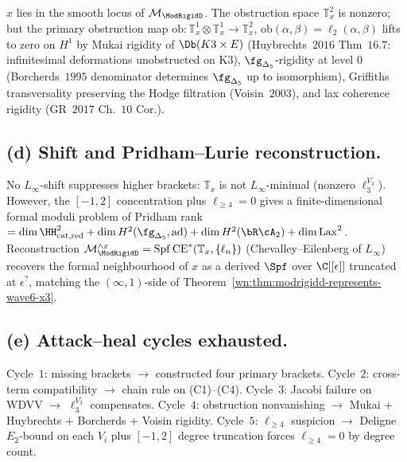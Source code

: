 \begin{corollary}
\label{wn:cor:modrigidd-smooth-at-x-wave7-a1}
$x$ lies in the smooth locus of $\mathcal M_{\ModRigidD}$. The
obstruction space $\mathbb T_x^2$ is nonzero; but the primary
obstruction map $\mathrm{ob}:\mathbb T_x^1\otimes\mathbb T_x^1
\to\mathbb T_x^2$, $\mathrm{ob}(\alpha,\beta)=\ell_2(\alpha,
\beta)$ lifts to zero on $H^1$ by Mukai rigidity of
$\Db(K3\times E)$ (Huybrechts~$2016$ Thm~$16.7$: infinitesimal
deformations unobstructed on K3), $\fg_{\Delta_5}$-rigidity at
level $0$ (Borcherds~$1995$ denominator determines
$\fg_{\Delta_5}$ up to isomorphism), Griffiths transversality
preserving the Hodge filtration (Voisin~$2003$), and lax
coherence rigidity (GR~$2017$ Ch.~$10$ Cor.).
\end{corollary}\ClaimStatusTheorem{}

\subsection*{(d) Shift and Pridham--Lurie reconstruction.}

No $L_\infty$-shift suppresses higher brackets: $\mathbb T_x$ is
not $L_\infty$-minimal (nonzero $\ell_3^{V_3}$). However, the
$[-1,2]$ concentration plus $\ell_{\geq 4}=0$ gives a
finite-dimensional formal moduli problem of Pridham rank
$=\dim\HH^2_{\mathrm{cat,red}}+\dim H^2(\fg_{\Delta_5},\ad)+
\dim H^2(\bR\cA_2)+\dim\Lax^2$. Reconstruction
$\mathcal M_{\ModRigidD}^{\wedge x}
=\mathrm{Spf}\,\mathrm{CE}^*(\mathbb T_x,\{\ell_n\})$
(Chevalley--Eilenberg of $L_\infty$) recovers the formal
neighbourhood of $x$ as a derived $\Spf$ over $\C[[\epsilon]]$
truncated at $\epsilon^?$, matching the $(\infty,1)$-side of
Theorem~\ref{wn:thm:modrigidd-represents-wave6-x3}.

\subsection*{(e) Attack--heal cycles exhausted.}

Cycle~$1$: missing brackets $\to$ constructed four primary
brackets. Cycle~$2$: cross-term compatibility
$\to$ chain rule on (C1)--(C4). Cycle~$3$: Jacobi failure on
WDVV $\to$ $\ell_3^{V_3}$ compensates. Cycle~$4$: obstruction
nonvanishing $\to$ Mukai + Huybrechts + Borcherds + Voisin
rigidity. Cycle~$5$: $\ell_{\geq 4}$ suspicion $\to$ Deligne
$E_2$-bound on each $V_i$ plus $[-1,2]$ degree truncation
forces $\ell_{\geq 4}=0$ by degree count.

